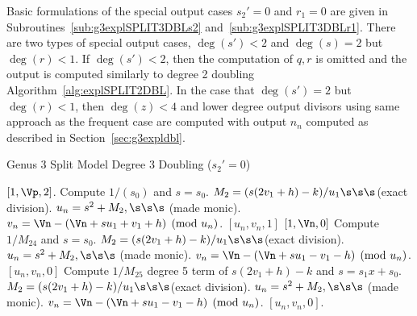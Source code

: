 Basic formulations of the special output cases $s_2' = 0$ and $r_1 = 0$ are
given in Subroutines~\ref{sub:g3explSPLIT3DBLs2}
and~\ref{sub:g3explSPLIT3DBLr1}. There are two types of special output cases,
$\deg(s') < 2$ and $\deg(s) = 2$ but $\deg(r) < 1$. If $\deg(s') < 2$, then the
computation of $q,r$ is omitted and the output is computed similarly to degree 2
doubling Algorithm~\ref{alg:explSPLIT2DBL}.  In the case that $\deg(s') = 2$ but
$\deg(r) < 1$, then $\deg(z) < 4$ and lower degree output divisors using same
approach as the frequent case are computed with output $n_n$ computed as
described in Section~\ref{sec:g3expldbl}.  

\begin{subroutine}[htbp]
\caption{Genus 3 Split Model Degree 3 Doubling ($s_2' = 0$)\label{sub:g3explSPLIT3DBLs2}}
\begin{algorithmic} [1]
     \Return $[1,\Vp,2]$.
    \Else
        \State Compute $1/(s_0)$ and $s = s_0$.
        \State $M_2 = (s(2v_1 + h) - k)/u_1 \s\s\s $(exact division).
        \State $u_n = s^2 + M_2, \s\s\s $ (made monic).
        \State $v_n = \Vn - (\Vn + su_1 + v_1 + h) \pmod{u_n}$.
        \State \Return $[u_n,v_n,1]$
    \EndIf
\EndIf
{}
     \Return $[1,\Vn,0]$
    \Else
        \State Compute $1/M_{24}$ and $s = s_0$.
        \State $M_2 = (s(2v_1 + h) - k)/u_1 \s\s\s $(exact division).
        \State $u_n = s^2 + M_2, \s\s\s $ (made monic).
        \State $v_n = \Vn - (\Vn + su_1 - v_1 - h) \pmod{u_n}$.
        \State \Return $[u_n,v_n,0]$
    \EndIf
\EndIf
\State Compute $1/M_{25}$ degree 5 term of $s(2v_1 + h) - k$ and $s = s_1x + s_0$.
\State $M_2 = (s(2v_1 + h) - k)/u_1 \s\s\s $(exact division).
\State $u_n = s^2 + M_2, \s\s\s $ (made monic).
\State $v_n = \Vn - (\Vn + su_1 - v_1 - h) \pmod{u_n}$.
\State \Return $[u_n,v_n,0]$.
\end{algorithmic}
\end{subroutine}

